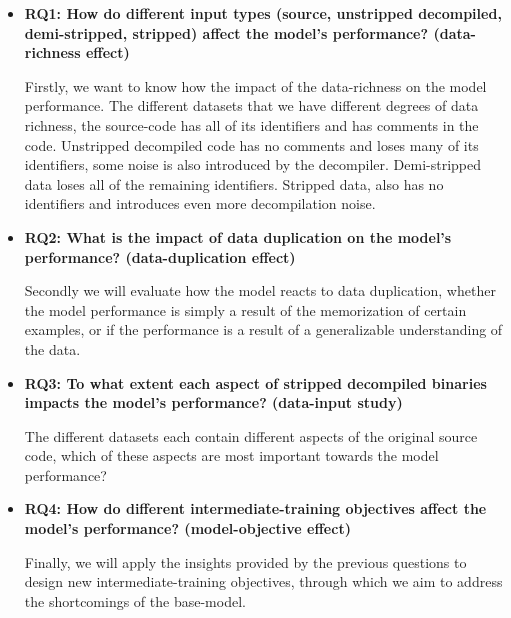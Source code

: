 
\begin{itemize}
    \item \textbf{RQ1: How do different input types (source, unstripped decompiled, demi-stripped, stripped) affect the model's performance? (data-richness effect)}
    \begin{sloppypar}
    Firstly, we want to know how the impact of the data-richness on the model performance. The different datasets that we have different degrees of data richness, the source-code has all of its identifiers and has comments in the code. Unstripped decompiled code has no comments and loses many of its identifiers, some noise is also introduced by the decompiler. Demi-stripped data loses all of the remaining identifiers. Stripped data, also has no identifiers and introduces even more decompilation noise.
    \end{sloppypar}
    \item \textbf{RQ2: What is the impact of data duplication on the model's performance? (data-duplication effect)}
    \begin{sloppypar}
    Secondly we will evaluate how the model reacts to data duplication, whether the model performance is simply a result of the memorization of certain examples, or if the performance is a result of a generalizable understanding of the data.
    \end{sloppypar}
    \item \textbf{RQ3: To what extent each aspect of stripped decompiled binaries impacts the model's performance? (data-input study)}
    \begin{sloppypar}
    The different datasets each contain different aspects of the original source code, which of these aspects are most important towards the model performance? 
    \end{sloppypar}
    \item \textbf{RQ4: How do different intermediate-training objectives affect the model's performance? (model-objective effect)}
    \begin{sloppypar}
    Finally, we will apply the insights provided by the previous questions to design new intermediate-training objectives, through which we aim to address the shortcomings of the base-model. 
    \end{sloppypar}
\end{itemize}


